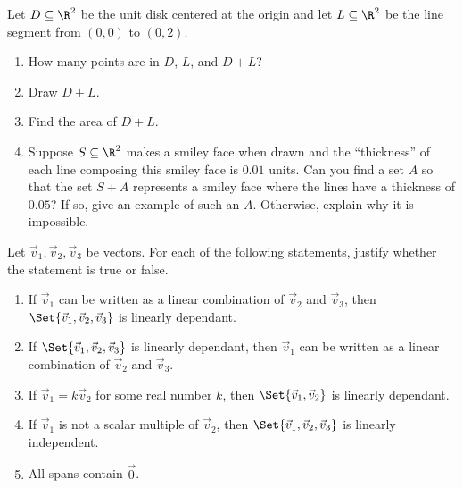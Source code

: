 \begin{exercises}
\begin{problist}
		\prob Let $D\subseteq\R^2$ be the unit disk centered at the origin and let $L\subseteq \R^2$ be
		the line segment from $(0,0)$ to $(0,2)$.
		\begin{enumerate}
			\item How many points are in $D$, $L$, and $D+L$?
			\item Draw $D+L$.
			\item Find the area of $D+L$.
			\item Suppose $S\subseteq\R^2$ makes a smiley face when drawn and the ``thickness'' of
				each line composing this smiley face is $0.01$ units. Can you find a set $A$ so
				that the set $S+A$ represents a smiley face where the lines have a thickness of $0.05$?
				If so, give an example of such an $A$. Otherwise, explain why it is impossible.
		\end{enumerate}

		\prob Let $\vec v_{1}, \vec v_{2}, \vec v_{3}$ be vectors. For each of the following statements,
		justify whether the statement is true or false.
		\begin{enumerate}
			\item If $\vec v_{1}$ can be written as a linear combination
				of $\vec v_{2}$ and $\vec v_{3}$, then $\Set{\vec
				v_1,\vec v_2,\vec v_3}$ is linearly dependant.

			\item If $\Set{\vec v_1,\vec v_2,\vec v_3}$ is linearly dependant,
				then $\vec v_{1}$ can be written as a linear combination
				of $\vec v_{2}$ and $\vec v_{3}$.

			\item If $\vec v_{1}=k\vec v_{2}$ for some real number $k$,
				then $\Set{\vec v_1,\vec v_2}$ is linearly dependant.

			\item If $\vec v_{1}$ is not a scalar multiple of $\vec
				v_{2}$, then $\Set{\vec v_1,\vec v_2,\vec v_3}$ is
				linearly independent.

			\item All spans contain $\vec 0$.
		\end{enumerate}
	\end{problist}
\end{exercises}
